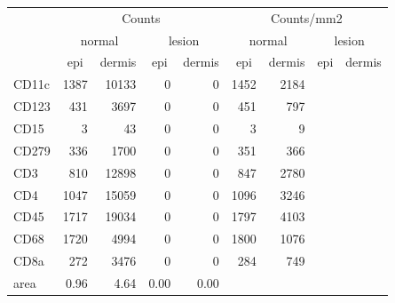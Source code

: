 \documentclass{article}
\begin{document}
\begin{tabular}{lrrrr|rrrr}
   \hline
 
         \multicolumn{1}{c}{} & \multicolumn{4}{c|}{Counts} & \multicolumn{4}{c}{Counts/mm2} \\ 
         \multicolumn{1}{c}{} & \multicolumn{2}{c}{normal} & \multicolumn{2}{c|}{lesion} & \multicolumn{2}{c}{normal} & \multicolumn{2}{c}{lesion}  \\ 
         \multicolumn{1}{c}{} & \multicolumn{1}{c}{epi} & dermis & \multicolumn{1}{c}{epi} & \multicolumn{1}{c|}{dermis} & \multicolumn{1}{c}{epi} & dermis & \multicolumn{1}{c}{epi} & dermis  \\ 
         \hline
    CD11c & 1387 & 10133 & 0 & 0 & 1452 & 2184 &  &  \\ 
  CD123 & 431 & 3697 & 0 & 0 & 451 & 797 &  &  \\ 
  CD15 & 3 & 43 & 0 & 0 & 3 & 9 &  &  \\ 
  CD279 & 336 & 1700 & 0 & 0 & 351 & 366 &  &  \\ 
  CD3 & 810 & 12898 & 0 & 0 & 847 & 2780 &  &  \\ 
  CD4 & 1047 & 15059 & 0 & 0 & 1096 & 3246 &  &  \\ 
  CD45 & 1717 & 19034 & 0 & 0 & 1797 & 4103 &  &  \\ 
  CD68 & 1720 & 4994 & 0 & 0 & 1800 & 1076 &  &  \\ 
  CD8a & 272 & 3476 & 0 & 0 & 284 & 749 &  &  \\ 
  area & 0.96 & 4.64 & 0.00 & 0.00 &    &    &    &    \\ 
   \hline
\end{tabular}
\end{document}
